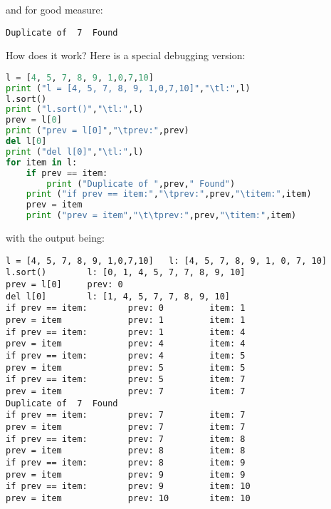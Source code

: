 and for good measure:
\scriptsize
\begin{verbatim}
Duplicate of  7  Found
\end{verbatim}
\normalsize

How does it work? Here is a special debugging version:
\lstset{basicstyle=\scriptsize, numbers=left, captionpos=b, tabsize=4}
\begin{lstlisting}[caption=For Loop List 3 Debug,language={Python},
xleftmargin=15pt, label=lst:forlooplist3debug]
l = [4, 5, 7, 8, 9, 1,0,7,10]
print ("l = [4, 5, 7, 8, 9, 1,0,7,10]","\tl:",l)
l.sort()
print ("l.sort()","\tl:",l)
prev = l[0]
print ("prev = l[0]","\tprev:",prev)
del l[0]
print ("del l[0]","\tl:",l)
for item in l:
    if prev == item:
        print ("Duplicate of ",prev," Found")
    print ("if prev == item:","\tprev:",prev,"\titem:",item)
    prev = item
    print ("prev = item","\t\tprev:",prev,"\titem:",item)
\end{lstlisting}

with the output being:
\scriptsize
\begin{verbatim}
l = [4, 5, 7, 8, 9, 1,0,7,10]   l: [4, 5, 7, 8, 9, 1, 0, 7, 10]
l.sort()        l: [0, 1, 4, 5, 7, 7, 8, 9, 10]
prev = l[0]     prev: 0
del l[0]        l: [1, 4, 5, 7, 7, 8, 9, 10]
if prev == item:        prev: 0         item: 1
prev = item             prev: 1         item: 1
if prev == item:        prev: 1         item: 4
prev = item             prev: 4         item: 4
if prev == item:        prev: 4         item: 5
prev = item             prev: 5         item: 5
if prev == item:        prev: 5         item: 7
prev = item             prev: 7         item: 7
Duplicate of  7  Found
if prev == item:        prev: 7         item: 7
prev = item             prev: 7         item: 7
if prev == item:        prev: 7         item: 8
prev = item             prev: 8         item: 8
if prev == item:        prev: 8         item: 9
prev = item             prev: 9         item: 9
if prev == item:        prev: 9         item: 10
prev = item             prev: 10        item: 10
\end{verbatim}
\normalsize

